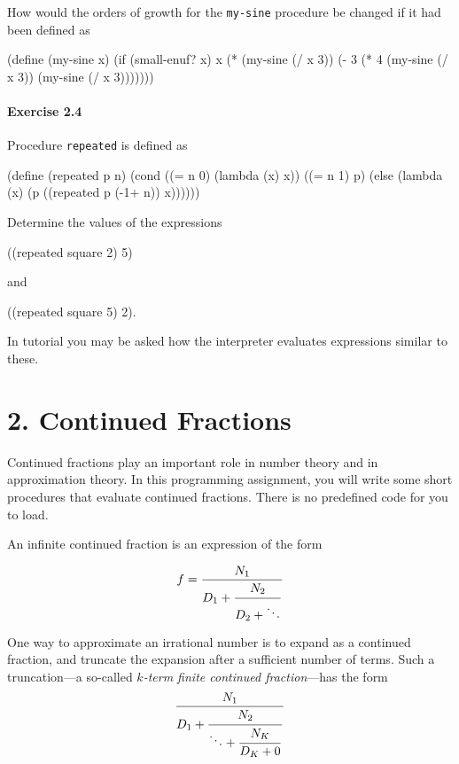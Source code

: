 How would the orders of growth for the {\tt my-sine} procedure
be changed if it had been defined as 

\beginlisp
(define (my-sine x)
  (if (small-enuf? x)
      x
      (* (my-sine (/ x 3)) 
         (- 3 
            (* 4 (my-sine (/ x 3))
                 (my-sine (/ x 3)))))))
\endlisp


\paragraph{ Exercise 2.4 }
Procedure {\tt repeated} is defined as

\beginlisp
(define (repeated p n)
  (cond ((= n 0) (lambda (x) x))
        ((= n 1) p)
        (else (lambda (x) (p ((repeated p (-1+ n)) x))))))
\endlisp 

Determine the values of the expressions

\beginlisp
((repeated square 2) 5)
\endlisp

and

\beginlisp
((repeated square 5) 2).
\endlisp

In tutorial you may be asked how the interpreter evaluates expressions
similar to these.


\section{2. Continued Fractions}

Continued fractions play an important role in number theory and in
approximation theory.  In this programming
assignment, you will write some short procedures that evaluate
continued fractions.  There is no predefined code for you to load.

An infinite continued fraction is an expression of the form

\begin{displaymath} 
f={{N_1} \over 
  {\displaystyle D_1 + {{\strut N_2} \over 
                {\displaystyle D_2 + \ddots }}}}
\end{displaymath} 

One way to approximate an irrational number is to expand as a
continued fraction, and truncate the expansion after a sufficient
number of terms.  Such a truncation---a so-called {\em $k$-term finite
continued fraction}---has the form
\begin{displaymath} 
{{N_1} \over {\displaystyle D_1+
        {\strut {N_2} \over {\displaystyle \ddots +
        {\strut {N_K} \over {\displaystyle D_K+0}}}}}}
\end{displaymath} 

